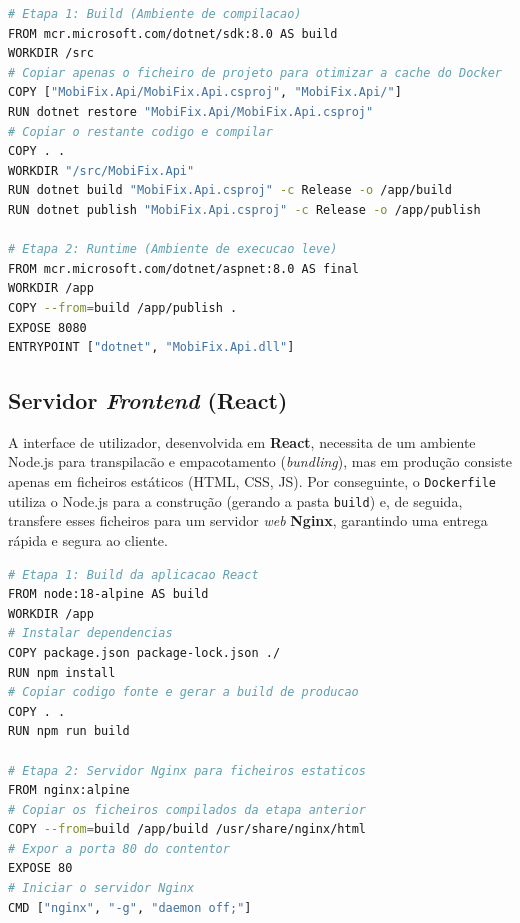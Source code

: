 \documentclass[a4paper,12pt]{scrreprt}
\begin{document}
\begin{lstlisting}[language=bash, caption={Dockerfile do Servidor de Lógica de Negócios (.NET)}, label={lst:dockerfile_dotnet}]
# Etapa 1: Build (Ambiente de compilacao)
FROM mcr.microsoft.com/dotnet/sdk:8.0 AS build
WORKDIR /src
# Copiar apenas o ficheiro de projeto para otimizar a cache do Docker
COPY ["MobiFix.Api/MobiFix.Api.csproj", "MobiFix.Api/"]
RUN dotnet restore "MobiFix.Api/MobiFix.Api.csproj"
# Copiar o restante codigo e compilar
COPY . .
WORKDIR "/src/MobiFix.Api"
RUN dotnet build "MobiFix.Api.csproj" -c Release -o /app/build
RUN dotnet publish "MobiFix.Api.csproj" -c Release -o /app/publish

# Etapa 2: Runtime (Ambiente de execucao leve)
FROM mcr.microsoft.com/dotnet/aspnet:8.0 AS final
WORKDIR /app
COPY --from=build /app/publish .
EXPOSE 8080
ENTRYPOINT ["dotnet", "MobiFix.Api.dll"]
\end{lstlisting}

\subsection{Servidor \textit{Frontend} (React)}
A interface de utilizador, desenvolvida em \textbf{React}, necessita de um ambiente Node.js para transpilacão e empacotamento (\textit{bundling}), mas em produção consiste apenas em ficheiros estáticos (HTML, CSS, JS). Por conseguinte, o \texttt{Dockerfile} utiliza o Node.js para a construção (gerando a pasta \texttt{build}) e, de seguida, transfere esses ficheiros para um servidor \textit{web} \textbf{Nginx}, garantindo uma entrega rápida e segura ao cliente.

\begin{lstlisting}[language=bash, caption={Dockerfile do Servidor Frontend (React + Nginx)}, label={lst:dockerfile_react}]
# Etapa 1: Build da aplicacao React
FROM node:18-alpine AS build
WORKDIR /app
# Instalar dependencias
COPY package.json package-lock.json ./
RUN npm install
# Copiar codigo fonte e gerar a build de producao
COPY . .
RUN npm run build

# Etapa 2: Servidor Nginx para ficheiros estaticos
FROM nginx:alpine
# Copiar os ficheiros compilados da etapa anterior
COPY --from=build /app/build /usr/share/nginx/html
# Expor a porta 80 do contentor
EXPOSE 80
# Iniciar o servidor Nginx
CMD ["nginx", "-g", "daemon off;"]
\end{lstlisting}
\end{document}

